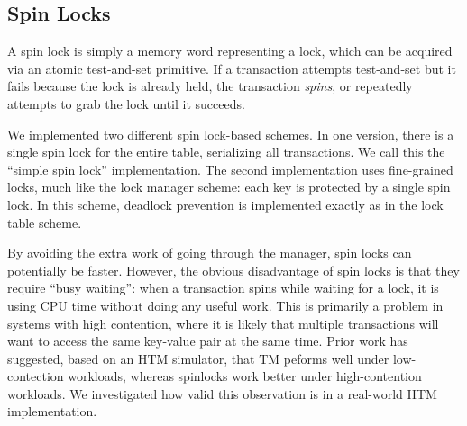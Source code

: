 \subsection{Spin Locks}

A spin lock is simply a memory word representing a lock, which can be acquired
via an atomic test-and-set primitive. If a transaction attempts test-and-set but
it fails because the lock is already held, the transaction \textit{spins}, or
repeatedly attempts to grab the lock until it succeeds.

We implemented two different spin lock-based schemes. In one version, there is a
single spin lock for the entire table, serializing all transactions. We call
this the ``simple spin lock'' implementation. The second implementation uses
fine-grained locks, much like the lock manager scheme: each key is protected by
a single spin lock. In this scheme, deadlock prevention is implemented exactly
as in the lock table scheme.

By avoiding the extra work of going through the manager, spin locks can
potentially be faster. However, the obvious disadvantage of spin locks is that
they require ``busy waiting'': when a transaction spins while waiting for a
lock, it is using CPU time without doing any useful work. This is primarily a
problem in systems with high contention, where it is likely that multiple
transactions will want to access the same key-value pair at the same time. Prior
work \citep{tran2010} has suggested, based on an HTM simulator, that TM peforms
well under low-contection workloads, whereas spinlocks work better under
high-contention workloads. We investigated how valid this observation is in a
real-world HTM implementation.


